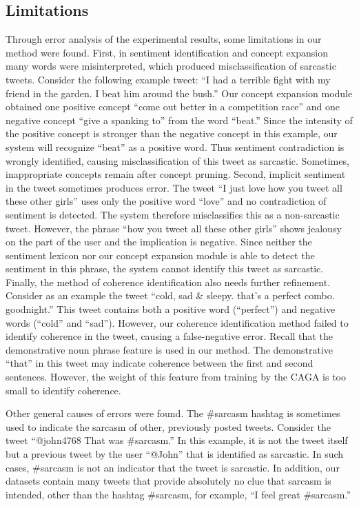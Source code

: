 \documentclass[english]{jnlp_1.4}
\begin{document}
\subsection{Limitations}

Through error analysis of the experimental results, some limitations in our method were found.
First, in sentiment identification and concept expansion many words were misinterpreted, which produced misclassification of sarcastic tweets.
Consider the following example tweet: ``I had a terrible fight with my friend in the garden. I beat him around the bush.'' Our concept expansion module obtained one positive concept ``come out better in a competition race'' and one negative concept ``give a spanking to'' from the word ``beat.''
Since the intensity of the positive concept is stronger than the negative concept in this example, our system will recognize ``beat'' as a positive word.
Thus sentiment contradiction is wrongly identified, causing misclassification of this tweet as sarcastic.
Sometimes, inappropriate concepts remain after concept pruning.
Second, implicit sentiment in the tweet sometimes produces error.
The tweet ``I just love how you tweet all these other girls'' uses only the positive word ``love'' and no contradiction of sentiment is detected.
The system therefore misclassifies this as a non-sarcastic tweet.
However, the phrase ``how you tweet all these other girls'' shows jealousy on the part of the user and the implication is negative.
Since neither the sentiment lexicon nor our concept expansion module is able to detect the sentiment in this phrase, the system cannot identify this tweet as sarcastic.
Finally, the method of coherence identification also needs further refinement.
Consider as an example the tweet ``cold, sad \& sleepy. that's a perfect combo. goodnight.''
This tweet contains both a positive word (``perfect'') and negative words (``cold'' and ``sad'').
However, our coherence identification method failed to identify coherence in the tweet, causing a false-negative error.
Recall that the demonstrative noun phrase feature is used in our method.
The demonstrative ``that'' in this tweet may indicate coherence between the first and second sentences.
However, the weight of this feature from training by the CAGA is too small to identify coherence.

Other general causes of errors were found.
The \#sarcasm hashtag is sometimes used to indicate the sarcasm of other, previously posted tweets.
Consider the tweet ``@john4768 That was \#sarcasm.''
In this example, it is not the tweet itself but a previous tweet by the user ``@John'' that is identified as sarcastic.
In such cases, \#sarcasm is not an indicator that the tweet is sarcastic.
In addition, our datasets contain many tweets that provide absolutely no clue that sarcasm is intended, other than the hashtag \#sarcasm, for example, ``I feel great \#sarcasm.''
\end{document}
